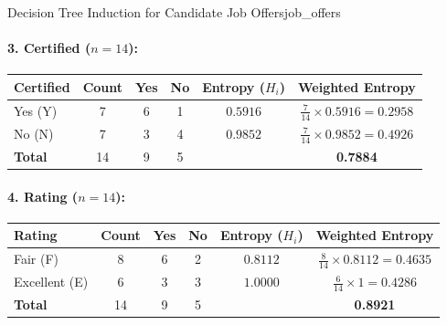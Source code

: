 \begin{example}{Decision Tree Induction for Candidate Job Offers}{job_offers}
\paragraph{3. Certified ($n = 14$):}
\begin{center}\renewcommand{\arraystretch}{1.35}
\begin{tabular}{lccccc}
\toprule
\textbf{Certified} & \textbf{Count} & \textbf{Yes} & \textbf{No} & \textbf{Entropy ($H_i$)} & \textbf{Weighted Entropy} \\
\midrule
Yes (Y) & 7 & 6 & 1 & $0.5916$ & $\frac{7}{14} \times 0.5916 = 0.2958$ \\
No (N)  & 7 & 3 & 4 & $0.9852$ & $\frac{7}{14} \times 0.9852 = 0.4926$ \\
\midrule
\textbf{Total} & 14 & 9 & 5 & & \textbf{0.7884} \\
\bottomrule
\end{tabular}
\end{center}

\paragraph{4. Rating ($n = 14$):}
\begin{center}\renewcommand{\arraystretch}{1.35}
\begin{tabular}{lccccc}
\toprule
\textbf{Rating} & \textbf{Count} & \textbf{Yes} & \textbf{No} & \textbf{Entropy ($H_i$)} & \textbf{Weighted Entropy} \\
\midrule
Fair (F)      & 8 & 6 & 2 & $0.8112$ & $\frac{8}{14} \times 0.8112 = 0.4635$ \\
Excellent (E) & 6 & 3 & 3 & $1.0000$ & $\frac{6}{14} \times 1 = 0.4286$ \\
\midrule
\textbf{Total} & 14 & 9 & 5 & & \textbf{0.8921} \\
\bottomrule
\end{tabular}
\end{center}


\end{example}
